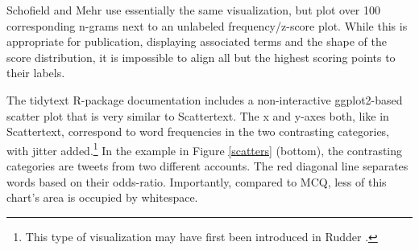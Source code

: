 \documentclass[11pt,a4paper]{article}
\begin{document}
Schofield and Mehr  use essentially the same visualization, but plot over 100 corresponding n-grams next to an unlabeled frequency/z-score plot.  While this is appropriate for publication, displaying associated terms and the shape of the score distribution, it is impossible to align all but the highest scoring points to their labels. 

The tidytext R-package \cite{tidytext} documentation includes a non-interactive ggplot2-based scatter plot that is very similar to Scattertext.   The x and y-axes both, like in Scattertext, correspond to word frequencies in the two contrasting categories, with jitter added.\footnote{This type of visualization may have first been introduced in Rudder .}  In the example in Figure \ref{scatters} (bottom), the contrasting categories are tweets from two different accounts.  The red diagonal line separates words based on their odds-ratio.  Importantly, compared to MCQ, less of this chart's area is occupied by whitespace. 
\end{document}
